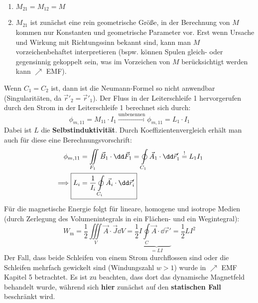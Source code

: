 		        \begin{enumerate}
			        \item \( M_{21} =  M_{12} =  M \) 
			        \item \( M_{21} \) ist zunächst eine rein geometrische Größe, in der Berechnung von $M$ kommen nur Konstanten und geometrische Parameter vor. Erst wenn Ursache und Wirkung mit Richtungssinn bekannt sind, kann man $M$ vorzeichenbehaftet interpretieren (bspw. können Spulen gleich- oder gegensinnig gekoppelt sein, was im Vorzeichen von $M$ berücksichtigt werden kann $\nearrow$ EMF).
		        \end{enumerate}
		   Wenn \(C_1 = C_2 \) ist, dann ist die Neumann-Formel so nicht anwendbar (Singularitäten, da $\vec{r}' _2 = \vec{r}' _1$). Der Fluss in der Leiterschleife 1 hervorgerufen durch den Strom in der Leiterschleife 1 berechnet sich durch:
		        \begin{equation}
			        \phi_{m,11} =  M_{11} \cdot  I_1 \xrightarrow{\text{umbenennen}} \boxed{\phi_{m,11} =  L_1 \cdot  I_1 } 
		        \end{equation}
		    Dabei ist $L$ die \textbf{Selbstinduktivität}. Durch Koeffizientenvergleich erhält man auch für diese eine Berechnungsvorschrift:
		        \begin{equation}\begin{split}
			        \phi_{m,11} &= \iint\limits_{F_1} \vec{B}_1  \cdot \dd\vec{F}_1 = \oint\limits_{C_1}  \vec{A}_1 \cdot \dd\vec{r}'_1  \stackrel{!}{=}  L_1  I_1 \\
			        \implies 	\Aboxed{ L_i &= \dfrac{1}{ I_i}\oint\limits_{C_i}  \vec{A_i} \cdot \dd\vec{r}'_i}
		        \end{split}\end{equation}
		   Für die magnetische Energie folgt für lineare, homogene und isotrope Medien (durch Zerlegung des Volumenintegrals in ein Flächen- und ein Wegintegral):
		        \begin{equation}
			        W _\mathrm{m} = \dfrac{1}{2}  \iiint\limits_{V}  \vec{A} \cdot \vec{J} \dd V
			        = \dfrac{1}{2}  I \underbrace{\oint\limits_{C}  \vec{A} \cdot \dd\vec{r}'}_{= L  I} = \dfrac{1}{2}  L  I^2
		        \end{equation}
		        Der Fall, dass beide Schleifen von einem Strom durchflossen sind oder die Schleifen mehrfach gewickelt sind (Windungszahl $w>1$) wurde in $\nearrow$ EMF Kapitel 5 betrachtet. Es ist zu beachten, dass dort das dynamische Magnetfeld behandelt wurde, während sich \textbf{hier} zunächst auf den \textbf{statischen Fall} beschränkt wird.

